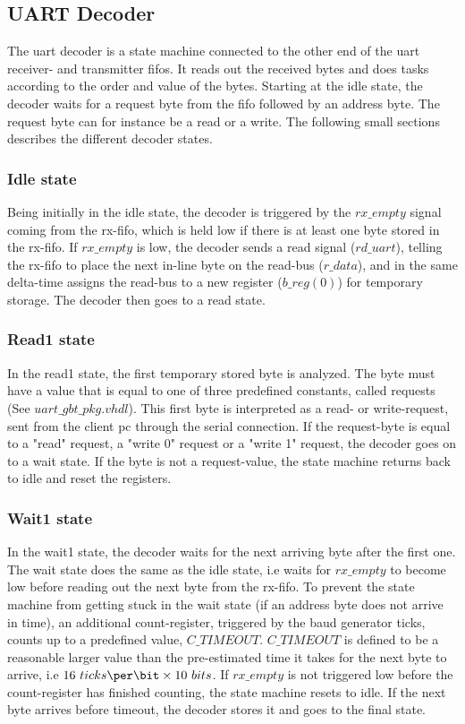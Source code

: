 \documentclass[main.tex]{subfiles}
\begin{document}
\subsection{UART Decoder}
The \gls{uart} decoder is a state machine connected to the other end of the \gls{uart} receiver- and transmitter \glspl{fifo}. It reads out the received bytes and does tasks according to the order and value of the bytes. Starting at the idle state, the decoder waits for a request byte from the fifo followed by an address byte. The request byte can for instance be a read or a write. The following small sections describes the different decoder states. 

\subsubsection{Idle state}
Being initially in the idle state, the decoder is triggered by the $rx\_empty$ signal coming from the rx-fifo, which is held low if there is at least one byte stored in the rx-fifo. If $rx\_empty$ is low, the decoder sends a read signal ($rd\_uart$), telling the rx-fifo to place the next in-line byte on the read-bus ($r\_data$), and in the same delta-time assigns the read-bus to a new register ($b\_reg(0)$) for temporary storage. The decoder then goes to a read state.

\subsubsection{Read1 state}
 In the read1 state, the first temporary stored byte is analyzed. The byte must have a value that is equal to one of three predefined constants, called requests (See $uart\_gbt\_pkg.vhdl$). This first byte is interpreted as a read- or write-request, sent from the client \acrshort{pc} through the serial connection. If the request-byte is equal to a "read" request, a "write 0" request or a "write 1" request, the decoder goes on to a wait state. If the byte is not a request-value, the state machine returns back to idle and reset the registers.

\subsubsection{Wait1 state}
  In the wait1 state, the decoder waits for the next arriving byte after the first one. The wait state does the same as the idle state, i.e waits for $rx\_empty$ to become low before reading out the next byte from the rx-fifo. To prevent the state machine from getting stuck in the wait state (if an address byte does not arrive in time), an additional count-register, triggered by the baud generator ticks, counts up to a predefined value, $C\_TIMEOUT$. $C\_TIMEOUT$ is defined to be a reasonable larger value than the pre-estimated time it takes for the next byte to arrive, i.e $16 ~ticks\per\bit \times 10 ~bits$. If $rx\_empty$ is not triggered low before the count-register has finished counting, the state machine resets to idle. If the next byte arrives before timeout, the decoder stores it and goes to the final state.
\end{document}
